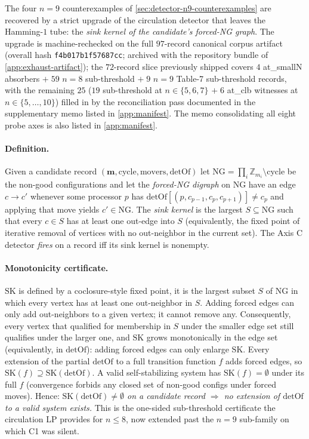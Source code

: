 \documentclass[11pt,a4paper]{article}
\theoremstyle{plain}
\theoremstyle{definition}
\newcommand{\SK}{\mathrm{SK}}
\newcommand{\detOf}{\mathrm{detOf}}
\begin{document}
The four $n = 9$ counterexamples of
\cref{sec:detector-n9-counterexamples} are recovered by a strict
upgrade of the circulation detector that leaves the Hamming-$1$
tube: the \emph{sink kernel of the candidate's forced-NG graph}.
The upgrade is machine-rechecked on the full $97$-record canonical
corpus artifact (overall hash \texttt{f4b017b1f57687cc}; archived
with the repository bundle of \cref{app:exhaust-artifact}); the
$72$-record slice previously shipped covers $4$ at\_smallN
absorbers $+\;59$ $n = 8$ sub-threshold $+\;9$ $n = 9$ Table-7
sub-threshold records, with the remaining $25$ ($19$ sub-threshold
at $n \in \{5, 6, 7\}$ $+\;6$ at\_clb witnesses at $n \in \{5,
\ldots, 10\}$) filled in by the reconciliation pass documented in
the supplementary memo listed in \cref{app:manifest}.  The memo
consolidating all eight probe axes is also listed in
\cref{app:manifest}.

\paragraph{Definition.} Given a candidate record $(\mathbf{m},
\mathrm{cycle}, \mathrm{movers}, \detOf)$ let $\mathrm{NG} =
\prod_i \mathbb{Z}_{m_i} \setminus \mathrm{cycle}$ be the non-good
configurations and let the \emph{forced-NG digraph} on $\mathrm{NG}$
have an edge $c \to c'$ whenever some processor $p$ has
$\detOf[(p, c_{p-1}, c_p, c_{p+1})] \ne c_p$ and applying that move
yields $c' \in \mathrm{NG}$.  The \emph{sink kernel} is the largest
$S \subseteq \mathrm{NG}$ such that every $c \in S$ has at least
one out-edge into $S$ (equivalently, the fixed point of iterative
removal of vertices with no out-neighbor in the current set).
The Axis C detector \emph{fires} on a record iff its sink kernel is
nonempty.

\paragraph{Monotonicity certificate.}  $\SK$ is defined by a
coclosure-style fixed point, it is the largest subset $S$ of
$\mathrm{NG}$ in which every vertex has at least one out-neighbor
in $S$.  Adding forced edges can only add out-neighbors to a given
vertex; it cannot remove any.  Consequently, every vertex that
qualified for membership in $S$ under the smaller edge set still
qualifies under the larger one, and $\SK$ grows monotonically in
the edge set (equivalently, in $\detOf$): adding forced edges can
only enlarge $\SK$.  Every extension of the partial $\detOf$ to a
full transition function $f$ adds forced edges, so
$\SK(f) \supseteq \SK(\detOf)$.
A valid self-stabilizing system has $\SK(f) = \emptyset$ under its
full $f$ (convergence forbids any closed set of non-good configs
under forced moves).  Hence:
\emph{$\SK(\detOf) \ne \emptyset$ on a candidate record $\Rightarrow$
no extension of $\detOf$ to a valid system exists.}  This is the
one-sided sub-threshold certificate the circulation LP provides for
$n \le 8$, now extended past the $n = 9$ sub-family on which C1
was silent.
\end{document}
